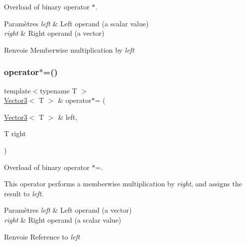 Overload of binary operator $\ast$. 


\begin{DoxyParams}{Paramètres}
{\em left} & Left operand (a scalar value) \\
\hline
{\em right} & Right operand (a vector)\\
\hline
\end{DoxyParams}
\begin{DoxyReturn}{Renvoie}
Memberwise multiplication by {\itshape left} 
\end{DoxyReturn}
\mbox{\label{classsf_1_1Vector3_ad5fb972775ce8ab58cd9670789e806a7}} 
\subsubsection{\texorpdfstring{operator$\ast$=()}{operator*=()}}
{\footnotesize\ttfamily template$<$typename T $>$ \\
\hyperlink{classsf_1_1Vector3}{Vector3}$<$ T $>$ \& operator$\ast$= (\begin{DoxyParamCaption}\item[{\hyperlink{classsf_1_1Vector3}{Vector3}$<$ T $>$ \&}]{left,  }\item[{T}]{right }\end{DoxyParamCaption})\hspace{0.3cm}{\ttfamily [related]}}



Overload of binary operator $\ast$=. 

This operator performs a memberwise multiplication by {\itshape right}, and assigns the result to {\itshape left}.


\begin{DoxyParams}{Paramètres}
{\em left} & Left operand (a vector) \\
\hline
{\em right} & Right operand (a scalar value)\\
\hline
\end{DoxyParams}
\begin{DoxyReturn}{Renvoie}
Reference to {\itshape left} 
\end{DoxyReturn}
\mbox{\label{classsf_1_1Vector3_a6500a0cb00e07801e9e9d7e96852ddd3}} 
